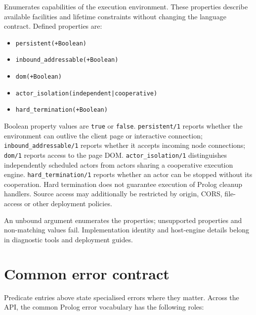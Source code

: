 \noindent Enumerates capabilities of the execution environment. These
properties describe available facilities and lifetime constraints without
changing the language contract. Defined properties are:

\begin{itemize}
\item \texttt{persistent(+Boolean)}
\item \texttt{inbound\_\allowbreak{}addressable(\allowbreak{}+Boolean)}
\item \texttt{dom(+Boolean)}
\item \texttt{actor\_\allowbreak{}isolation(\allowbreak{}independent|cooperative)}
\item \texttt{hard\_\allowbreak{}termination(\allowbreak{}+Boolean)}
\end{itemize}

\noindent Boolean property values are \texttt{true} or \texttt{false}.
\texttt{persistent/1} reports whether the environment can outlive the client
page or interactive connection; \texttt{inbound\_\allowbreak{}addressable/1} reports whether
it accepts incoming node connections; \texttt{dom/1} reports access to the
page DOM. \texttt{actor\_\allowbreak{}isolation/1} distinguishes independently scheduled
actors from actors sharing a cooperative execution engine.
\texttt{hard\_\allowbreak{}termination/1} reports whether an actor can be stopped without
its cooperation. Hard termination does not guarantee execution of Prolog
cleanup handlers. Source access may additionally be restricted by origin,
CORS, file-access or other deployment policies.

An unbound argument enumerates the properties; unsupported properties and
non-matching values fail. Implementation identity and host-engine details
belong in diagnostic tools and deployment guides.

\section{Common error contract}\label{sec:manual-errors}
Predicate entries above state specialised errors where they matter.  Across
the API, the common Prolog error vocabulary has the following roles:

